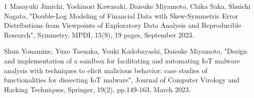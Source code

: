 \begin{雑誌論文}{1}
Masayuki Jimichi, Yoshinori Kawasaki, Daisuke Miyamoto, Chika Saka, Shuichi Nagata,
"Double-Log Modeling of Financial Data with Skew-Symmetric Error Distributions from Viewpoints of Exploratory Data Analysis and Reproducible Research",
Symmetry, MPDI, 15(9), 19 pages, September 2023. 

Shun Yonamine, Yuzo Taenaka, Youki Kadobayashi, Daisuke Miyamoto,
"Design and implementation of a sandbox for facilitating and automating IoT malware analysis with techniques to elicit malicious behavior: case studies of functionalities for dissecting IoT malware",
Journal of Computer Virology and Hacking Techniques, Springer, 19(2), pp.149-163, March 2023.






\end{雑誌論文}

